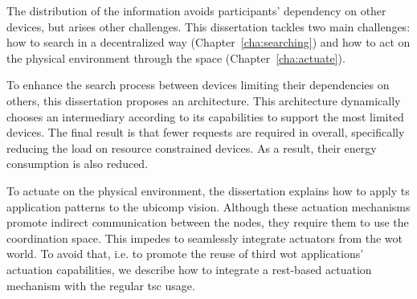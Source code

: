 The distribution of the information avoids participants' dependency on other devices, but arises other challenges.
This dissertation tackles two main challenges: how to search in a decentralized way (Chapter~\ref{cha:searching}) and how to act on the physical environment through the space (Chapter~\ref{cha:actuate}).


To enhance the search process between devices limiting their dependencies on others, this dissertation proposes an architecture.
This architecture dynamically chooses an intermediary according to its capabilities to support the most limited devices.
The final result is that fewer requests are required in overall, specifically reducing the load on resource constrained devices.
As a result, their energy consumption is also reduced.


To actuate on the physical environment, the dissertation explains how to apply \ac{ts} application patterns to the \ac{ubicomp} vision.
Although these actuation mechanisms promote indirect communication between the nodes, they require them to use the coordination space.
This impedes to seamlessly integrate actuators from the \ac{wot} world. %
To avoid that, i.e. to promote the reuse of third \ac{wot} applications' actuation capabilities, we describe how to integrate a \ac{rest}-based actuation mechanism with the regular \ac{tsc} usage.







